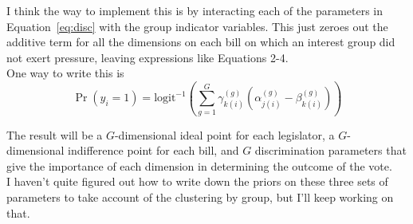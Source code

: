 \documentclass[12pt]{article}
\newcommand{\ga}{\gamma}
\begin{document}
I think the way to implement this is by interacting each of the parameters in Equation~\ref{eq:disc} with the group indicator variables. This just zeroes out the additive term for all the dimensions on each bill on which an interest group did not exert pressure, leaving expressions like Equations 2-4. \\

One way to write this is
\begin{equation}
  \Pr(y_i = 1) = \text{logit}^{-1}\left( \sum_{g=1}^G \ga_{k(i)}^{(g)}\left( \alpha_{j(i)}^{(g)} - \beta_{k(i)}^{(g)}\right) \right)
\end{equation}

The result will be a $G$-dimensional ideal point for each legislator, a $G$-dimensional indifference point for each bill, and $G$ discrimination parameters that give the importance of each dimension in determining the outcome of the vote. \\

I haven't quite figured out how to write down the priors on these three sets of parameters to take account of the clustering by group, but I'll keep working on that.
\end{document}
